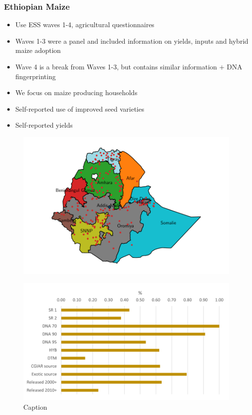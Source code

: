 \documentclass{beamer}
\begin{document}
\begin{frame}
\frametitle{Ethiopian Maize}

\begin{itemize}
    \item Use ESS waves 1-4, agricultural questionnaires
    \item Waves 1-3 were a panel and included information on yields, inputs and hybrid maize adoption
    \item Wave 4 is a break from Waves 1-3, but contains similar information $+$ DNA fingerprinting
    \item We focus on maize producing households 
    \item Self-reported use of improved seed varieties
    \item Self-reported yields
\end{itemize}

\begin{figure}
    \centering
    \includegraphics[scale=.4]{results/figures/map_hhids.pdf}
\end{figure}

\end{frame}

\begin{frame}{}

\begin{figure}
    \centering
    \includegraphics[width=.7\textwidth]{results/figures/adoption_r4.png}
    \caption{Caption}
    \label{fig:my_label}
\end{figure}
    
\end{frame}
\end{document}
